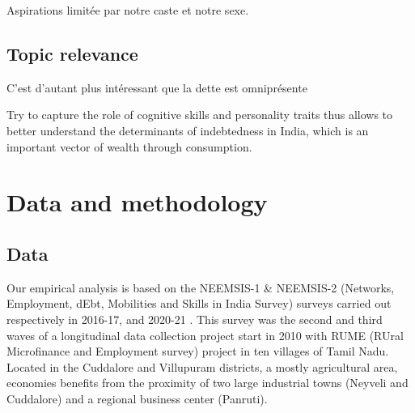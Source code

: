 \documentclass[a4paper, 11pt, onecolumn]{article}
\begin{document}
Aspirations limitée par notre caste et notre sexe.










	\subsection{Topic relevance}



C'est d'autant plus intéressant que la dette est omniprésente \cite{Guerin2013, Guerin2020}

Try to capture the role of cognitive skills and personality traits thus allows to better understand the determinants of indebtedness in India, which is an important vector of wealth through consumption. 












\newpage
\section{Data and methodology}


	\subsection{Data}

Our empirical analysis is based on the NEEMSIS-1 \& NEEMSIS-2 (Networks, Employment, dEbt, Mobilities and Skills in India Survey) surveys carried out respectively in 2016-17, and 2020-21 \citep{NEEMSISreport, NEEMSIS2017}.
This survey was the second and third waves of a longitudinal data collection project start in 2010 with RUME (RUral Microfinance and Employment survey) project in ten villages of Tamil Nadu.
Located in the Cuddalore and Villupuram districts, a mostly agricultural area, economies benefits from the proximity of two large industrial towns (Neyveli and Cuddalore) and a regional business center (Panruti).
\end{document}
